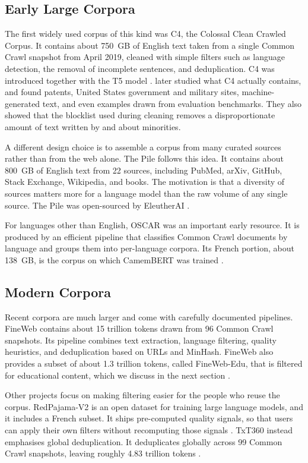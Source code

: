 \subsection{Early Large Corpora}

The first widely used corpus of this kind was C4, the Colossal Clean Crawled Corpus. It
contains about 750~GB of English text taken from a single Common Crawl snapshot from April
2019, cleaned with simple filters such as language detection, the removal of incomplete
sentences, and deduplication. C4 was introduced together with the T5 model
\citep{raffel2020t5}. \citet{dodge2021documenting} later studied what C4 actually contains,
and found patents, United States government and military sites, machine-generated text, and
even examples drawn from evaluation benchmarks. They also showed that the blocklist used
during cleaning removes a disproportionate amount of text written by and about minorities.

A different design choice is to assemble a corpus from many curated sources rather than from
the web alone. The Pile follows this idea. It contains about 800~GB of English text from 22
sources, including PubMed, arXiv, GitHub, Stack Exchange, Wikipedia, and books. The
motivation is that a diversity of sources matters more for a language model than the raw
volume of any single source. The Pile was open-sourced by EleutherAI \citep{gao2020pile}.

For languages other than English, OSCAR was an important early resource. It is produced by
an efficient pipeline that classifies Common Crawl documents by language and groups them
into per-language corpora. Its French portion, about 138~GB, is the corpus on which
CamemBERT was trained \citep{OrtizSuarezSagotRomary2019}.

\subsection{Modern Corpora}

Recent corpora are much larger and come with carefully documented pipelines. FineWeb
contains about 15 trillion tokens drawn from 96 Common Crawl snapshots. Its pipeline
combines text extraction, language filtering, quality heuristics, and deduplication based
on URLs and MinHash. FineWeb also provides a subset of about 1.3 trillion tokens, called
FineWeb-Edu, that is filtered for educational content, which we discuss in the next section
\citep{penedo2024fineweb}.

Other projects focus on making filtering easier for the people who reuse the corpus.
RedPajama-V2 is an open dataset for training large language models, and it includes a French
subset. It ships pre-computed quality signals, so that users can apply their own filters
without recomputing those signals \citep{weber2024redpajama}. TxT360 instead emphasises
global deduplication. It deduplicates globally across 99 Common Crawl snapshots, leaving roughly 4.83 trillion
tokens \citep{tang2024txt360}.

